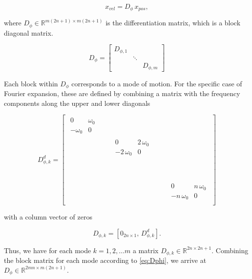 \documentclass[]{article}
\begin{document}
\begin{equation}
	x_{vel} = D_{\phi} \, x_{pos},
\end{equation}

\noindent{}where $D_{\phi} \in \mathbb{R}^{m(2n+1) \times m(2n+1)}$ is the differentiation matrix, which is a block diagonal matrix.

\begin{equation}\label{eq:Dphi}
	D_{\phi} =
	\begin{bmatrix}
	D_{\phi,1} & & \\
	& \ddots & \\
	 & & D_{\phi,m}
	\end{bmatrix}
\end{equation}

\noindent{}Each block within $D_{\phi}$ corresponds to a mode of motion.
For the specific case of Fourier expansion, these are defined by combining a matrix with the frequency components along the upper and lower diagonals

\begin{equation}\label{eq:Dphi_blocks}
D^d_{\phi,k} = \begin{bmatrix}
	\begin{matrix} 0 &  \omega_0 \\ -\omega_0 & 0 \end{matrix} \\
	& \begin{matrix} 	0 & 2 \, \omega_0 \\ -2 \, \omega_0 & 0	\end{matrix} \\
	\phantom{\begin{matrix} 	0 & 2 \, \omega_0 \\ -2 \, \omega_0 & 0	\end{matrix}}\\
	&&&&\begin{matrix} 0 & n \, \omega_0 \\ -n \, \omega_0 & 0 \end{matrix} \\
\end{bmatrix}
\end{equation}

\noindent{}with a column vector of zeros

\begin{equation}
	D_{\phi,k} = [0_{2n\times1},\, D^d_{\phi,k}] .
\end{equation}

\noindent{}Thus, we have for each mode $k=1,2,\dots m$ a matrix $D_{\phi,k} \in \mathbb{R}^{2n\times2n+1}$.
Combining the block matrix for each mode according to \eqref{eq:Dphi}, we arrive at $D_{\phi} \in \mathbb{R}^{2mn \times m(2n+1)}$.
\end{document}
